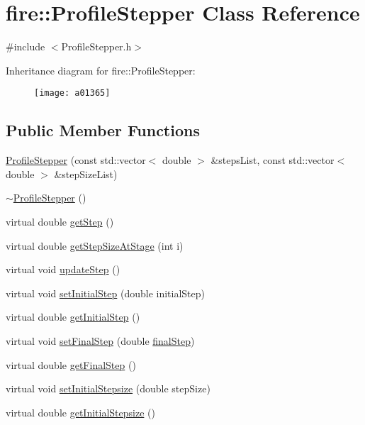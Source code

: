 \hypertarget{a01365}{}\section{fire\+:\+:Profile\+Stepper Class Reference}
\label{a01365}


{\ttfamily \#include $<$Profile\+Stepper.\+h$>$}

Inheritance diagram for fire\+:\+:Profile\+Stepper\+:\begin{figure}[H]
\begin{center}
\leavevmode
\texttt{[image: a01365]}
\end{center}
\end{figure}
\subsection*{Public Member Functions}
\begin{DoxyCompactItemize}
\item 
\hyperlink{a01365_a5bba5babbcb293b5e6a535cc4d06c55f}{Profile\+Stepper} (const std\+::vector$<$ double $>$ \&steps\+List, const std\+::vector$<$ double $>$ \&step\+Size\+List)
\item 
\hyperlink{a01365_a6838143d952dec2519a43c576a1f1546}{$\sim$\+Profile\+Stepper} ()
\item 
virtual double \hyperlink{a01365_a9096ad65a3fcf63678b600cbe0c33961}{get\+Step} ()
\item 
virtual double \hyperlink{a01365_adaa1a23c068977ecc6809dd8eecab49d}{get\+Step\+Size\+At\+Stage} (int i)
\item 
virtual void \hyperlink{a01365_a2c13fd4da5550f1e58df2b54bbfe4c2c}{update\+Step} ()
\item 
virtual void \hyperlink{a01365_adf2f78648d9539282225117c0fd243af}{set\+Initial\+Step} (double initial\+Step)
\item 
virtual double \hyperlink{a01365_af24660fa4bd027f877d5c1bdeb286cf5}{get\+Initial\+Step} ()
\item 
virtual void \hyperlink{a01365_af8203296b4f3bef53bafab7cb654cc97}{set\+Final\+Step} (double \hyperlink{a01365_a4f2347f039417fe9cdd16d3ca74a072d}{final\+Step})
\item 
virtual double \hyperlink{a01365_ae6f257aca7b3bb62a851169a01bcaacf}{get\+Final\+Step} ()
\item 
virtual void \hyperlink{a01365_a55c44fd97d8b6a474243ad0da48b039d}{set\+Initial\+Stepsize} (double step\+Size)
\item 
virtual double \hyperlink{a01365_a86e7035366907a08a36722655746271e}{get\+Initial\+Stepsize} ()
\end{DoxyCompactItemize}
